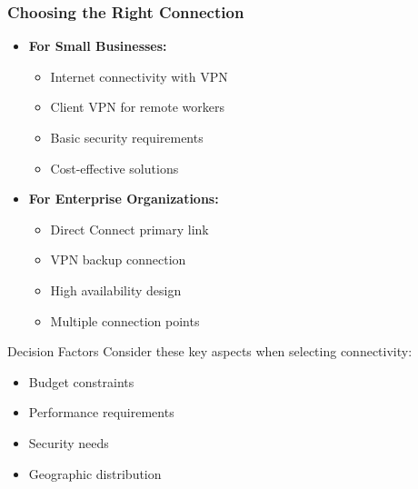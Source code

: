\documentclass{beamer}
\begin{document}
\begin{frame}
    \frametitle{Choosing the Right Connection}
    
    \begin{itemize}
        \item \textbf{For Small Businesses:}
        \begin{itemize}
            \item Internet connectivity with VPN
            \item Client VPN for remote workers
            \item Basic security requirements
            \item Cost-effective solutions
        \end{itemize}
        
        \item \textbf{For Enterprise Organizations:}
        \begin{itemize}
            \item Direct Connect primary link
            \item VPN backup connection
            \item High availability design
            \item Multiple connection points
        \end{itemize}
    \end{itemize}
    
    \begin{block}{Decision Factors}
        Consider these key aspects when selecting connectivity:
        \begin{itemize}
            \item Budget constraints
            \item Performance requirements
            \item Security needs
            \item Geographic distribution
        \end{itemize}
    \end{block}
\end{frame}
\end{document}
